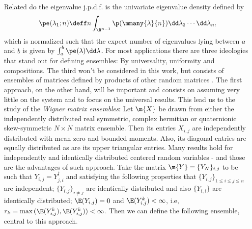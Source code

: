 Related do the eigenvalue j.p.d.f. is the univariate eigenvalue density defined by 
\begin{equation}
	\pe(\lambda_1; n) \deff n \int_{\R^{n-1}} \p(\mmany{\lambda}{n}) \dd \lambda_2 \cdots \dd \lambda_n,
\end{equation}
which is normalized such that the expect number of eigenvalues lying between $a$ and $b$ is given by $\int_{a}^{b} \pe(\lambda) \dd \lambda$. For most applications there are three ideologies that stand out for defining ensembles: By universality, uniformity and compositions. The third won't be considered in this work, but consists of ensembles of matrices defined by products of other random matrices \cite{Marcin_Pozniak_1998}. The first approach, on the other hand, will be important and consists on assuming very little on the system and to focus on the universal results. This lead us to the study of the \textit{Wigner matrix ensembles}: Let $\m{X}$ be drawn from either the independently distributed real symmetric, complex hermitian or quaternionic skew-symmetric $N \times N$ matrix ensemble. Then its entries $X_{i,j}$ are independently distributed with mean zero and bounded moments. Also, its diagonal entries are equally distributed as are its upper triangular entries. Many results hold for independently and identically distributed centered random variables - and those are the advantages of such approach. Take the matrix $\m{Y} = \{Y_N\}_{i,j}$ to be such that $Y_{i,j} = Y_{j,i}^\dagger$ and satisfying the following properties that $\{Y_{i,j}\}_{1\leq i \leq j \leq n}$ are independent; $\{Y_{i,j}\}_{i \neq j}$ are identically distributed and also $\{Y_{i,i}\}$ are identically distributed; $\E(Y_{i,j}) = 0$  and $ \E(Y_{i,j}^k)< \infty$, i.e, $r_k = \max{(\E(Y_{i,j}^k), \E(Y_{i,j}^k))} < \infty$. Then we can define the following ensemble, central to this approach.


